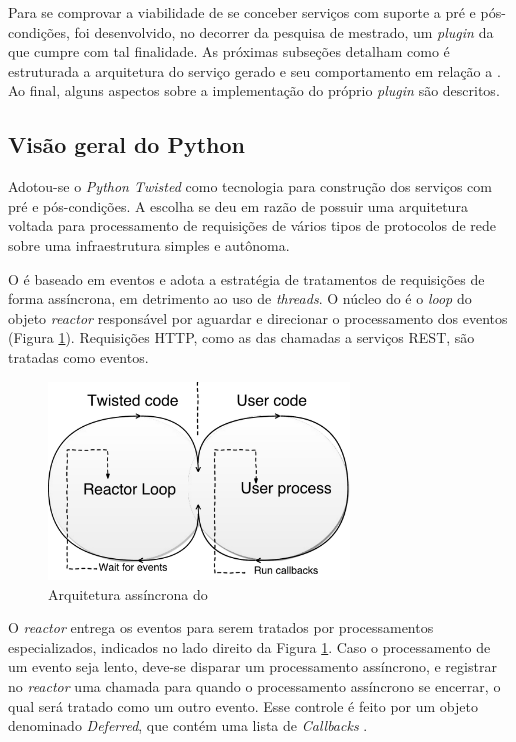 Para se comprovar a viabilidade de se conceber serviços com suporte a pré e
pós-condições, foi desenvolvido, no decorrer da pesquisa de mestrado, um
\textit{plugin} da \neoidl{} que cumpre com tal finalidade. As próximas
subseções detalham como é estruturada a arquitetura do serviço gerado e seu comportamento em relação a
\designbycontract{}. Ao final, alguns aspectos sobre a implementação do
próprio \textit{plugin} são descritos.

\subsection{Visão geral do Python \twisted{}}
\label{PythonTwisted}

Adotou-se o \framework{} \emph{Python Twisted}\cite{fettig2005twisted} como tecnologia para
construção dos serviços com pré e pós-condições. A escolha se deu em razão de
\twisted{} possuir uma arquitetura voltada para processamento de requisições de vários
tipos de protocolos de rede sobre uma infraestrutura simples e autônoma. 

O \twisted{} é baseado em eventos e adota a estratégia de tratamentos de
requisições de forma assíncrona, em detrimento ao uso de \textit{threads}. O
núcleo do \twisted{} é o \textit{loop} do objeto \emph{reactor} responsável por
aguardar e direcionar o processamento dos eventos (Figura
\ref{Fig:TwistedReactor}). Requisições HTTP, como as das chamadas a serviços
REST, são tratadas como eventos.

\begin{figure}[!htb]
\centering
\includegraphics[width=80mm,trim = 0mm 0mm 0mm
0mm,clip]{img/TwistedReactor.pdf}
\caption{Arquitetura assíncrona do \twisted{}}
\label{Fig:TwistedReactor}
\end{figure}

O \emph{reactor} entrega os eventos para serem tratados por processamentos
especializados, indicados no lado direito da Figura \ref{Fig:TwistedReactor}.
Caso o processamento de um evento seja lento, deve-se disparar um
processamento assíncrono, e registrar no \emph{reactor} uma chamada para quando
o processamento assíncrono se encerrar, o qual será tratado como um outro
evento.
Esse controle é feito por um objeto denominado \emph{Deferred}, que contém uma lista
de \emph{Callbacks} \cite{fettig2005twisted}.


